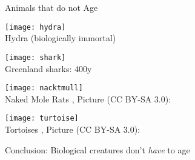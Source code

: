 \begin{frame}[c]{Animals that do not Age}
    \scriptsize
    \begin{multicols}{2}
        \texttt{[image: hydra]} \\
        Hydra (biologically immortal) \cite{martinez1998mortality} \\
        \pause

        \texttt{[image: shark]} \\
        Greenland sharks: 400y \cite{Greenlan67:online} \\
        \pause

        \texttt{[image: nacktmull]} \\
        Naked Mole Rats \cite{ruby2018naked},
        Picture (CC BY-SA 3.0): \cite{Nacktmul31:online} \\
        \pause

        \texttt{[image: turtoise]} \\
        Tortoises \cite{miller2001escaping},
        Picture (CC BY-SA 3.0): \cite{Tortoise98:online} \\
    \end{multicols}
    \pause
    \normalsize
    Conclusion: Biological creatures don't {\em have} to age
\end{frame}



